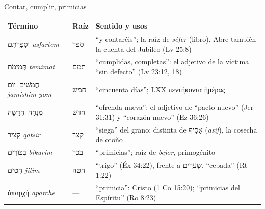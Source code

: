 \documentclass[hyperref={bookmarks=false},aspectratio=169]{beamer}
\newcommand{\heb}[1]{\mbox{\foreignlanguage{hebrew}{#1}}}
\newcommand{\grc}[1]{\foreignlanguage{ancientgreek}{#1}}
\begin{document}
\begin{frame}{Contar, cumplir, primicias}
\scriptsize\renewcommand{\arraystretch}{1.15}
\begin{tabular}{@{}L{2.9cm}L{1.1cm}L{7.8cm}@{}}
\toprule
\textbf{Término} & \textbf{Raíz} & \textbf{Sentido y usos} \\ \midrule
\heb{וּסְפַרְתֶּם} \emph{usfartem} & \heb{ספר} & ``y contaréis''; la raíz de \emph{séfer} (libro). Abre también la cuenta del Jubileo (Lv 25:8) \\
\heb{תְּמִימֹת} \emph{temimot} & \heb{תמם} & ``cumplidas, completas'': el adjetivo de la víctima ``sin defecto'' (Lv 23:12, 18) \\
\heb{חֲמִשִּׁים יוֹם} \emph{jamishim yom} & \heb{חמשׁ} & ``cincuenta días''; LXX \grc{πεντήκοντα ἡμέρας} \\
\heb{מִנְחָה חֲדָשָׁה} & \heb{חדשׁ} & ``ofrenda nueva'': el adjetivo de ``pacto nuevo'' (Jer 31:31) y ``corazón nuevo'' (Ez 36:26) \\
\heb{קָצִיר} \emph{qatsir} & \heb{קצר} & ``siega'' del grano; distinta de \heb{אָסִיף} (\emph{asif}), la cosecha de otoño \\
\heb{בִּכּוּרִים} \emph{bikurim} & \heb{בכר} & ``primicias''; raíz de \emph{bejor}, primogénito \\
\heb{חִטִּים} \emph{jitim} & \heb{חטה} & ``trigo'' (Éx 34:22), frente a \heb{שְׂעֹרִים}, ``cebada'' (Rt 1:22) \\
\grc{ἀπαρχή} \emph{aparchē} & --- & ``primicia'': Cristo (1 Co 15:20); ``primicias del Espíritu'' (Ro 8:23) \\
\bottomrule
\end{tabular}
\end{frame}
\end{document}
